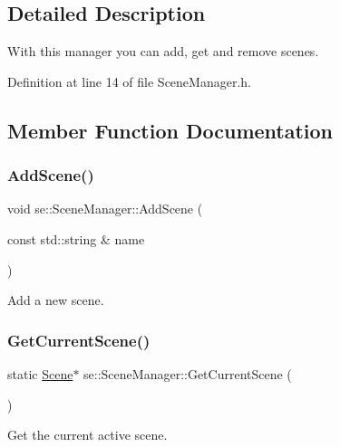 \subsection{Detailed Description}
With this manager you can add, get and remove scenes. 

Definition at line 14 of file Scene\+Manager.\+h.



\subsection{Member Function Documentation}
\mbox{\label{classse_1_1_scene_manager_a9ad26f193f547285f4eae5c440f24a10}} 
\subsubsection{\texorpdfstring{Add\+Scene()}{AddScene()}}
{\footnotesize\ttfamily void se\+::\+Scene\+Manager\+::\+Add\+Scene (\begin{DoxyParamCaption}\item[{const std\+::string \&}]{name }\end{DoxyParamCaption})}

Add a new scene. \mbox{\label{classse_1_1_scene_manager_a79b72ff927600fa9ef24f1dae177b566}} 
\subsubsection{\texorpdfstring{Get\+Current\+Scene()}{GetCurrentScene()}}
{\footnotesize\ttfamily static \mbox{\hyperlink{classse_1_1_scene}{Scene}}$\ast$ se\+::\+Scene\+Manager\+::\+Get\+Current\+Scene (\begin{DoxyParamCaption}{ }\end{DoxyParamCaption})\hspace{0.3cm}{\ttfamily [static]}}

Get the current active scene. \mbox{\label{classse_1_1_scene_manager_a670006ca4d20028e0778074e94fa0640}} 
